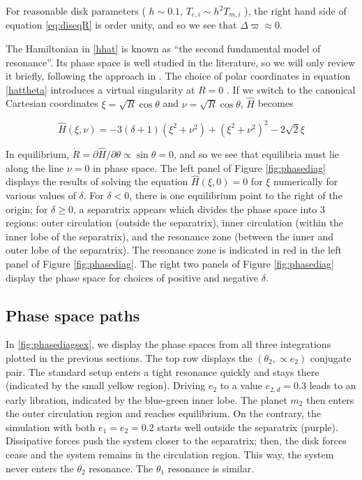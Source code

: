\documentclass{mnras}
\renewcommand{\d}{\partial}
\begin{document}
For reasonable disk parameters ( \(h\sim 0.1\), \(T_{e,i}\sim h^2
T_{m,i}\) ), the right hand side of equation \eqref{eq:diseqR}
is order unity, and so we see that \(\Delta\varpi\approx 0\).


The Hamiltonian in \eqref{hhat} is known as ``the second fundamental
model of resonance''. Its phase space is well studied in the
literature, so we will only review it briefly, following the approach
in \cite{henrard_second_1983}.  The choice of polar coordinates in
equation \eqref{hattheta} introduces a virtual singularity at \(R=0\)
\cite{henrard_second_1983}.  If we switch to the canonical Cartesian
coordinates \(\xi = \sqrt{R}\cos\theta\) and \(\nu = \sqrt{R}\cos\theta\),
\(\hat H\) becomes

\begin{equation}
  \hat H(\xi,\nu) = -3(\delta+1)(\xi^2+\nu^2) + (\xi^2+\nu^2)^2 -2\sqrt2
  \xi
\end{equation}

In equilibrium, \(\dot R = \d\hat H/\d\theta \propto \sin\theta= 0\),
and so we see that equilibria must lie along the line \(\nu=0\) in phase
space.  The left panel of Figure \ref{fig:phasediag} displays the
results of solving the equation \(\hat H(\xi, 0) = 0\) for \(\xi\)
numerically for various values of \(\delta\).  For \(\delta<0\), there is
one equilibrium point to the right of the origin; for \(\delta \geq 0\),
a separatrix appears which divides the phase space into 3 regions:
outer circulation (outside the separatrix), inner circulation (within
the inner lobe of the separatrix), and the resonance zone (between the
inner and outer lobe of the separatrix).  The resonance zone is
indicated in red in the left panel of Figure \ref{fig:phasediag}.  The
right two panels of Figure \ref{fig:phasediag} display the phase space
for choices of positive and negative \(\delta\).

\subsection{Phase space paths}
\label{sec:orga7d9d09}
\begin{figure*}
  \centering
  \texttt{[image: \{./relative-geometry]}.png}
  \caption{ }
  \label{fig:relgeom}
\end{figure*}
In \ref{fig:phasediagsex}, we display the phase spaces from all three
integrations plotted in the previous sections.
The top row displays the \((\theta_2, \propto e_2)\) conjugate pair.
The standard setup enters a tight resonance quickly and stays there (indicated by the small yellow region).
Driving \(e_2\) to a value \(e_{2,d}=0.3\) leads to an early libration, indicated by the blue-green inner lobe.
The planet \(m_2\) then enters the outer circulation region and reaches equilibrium.
On the contrary, the simulation with both \(e_1 = e_2 = 0.2\) starts well outside the separatrix (purple).
Dissipative forces push the system closer to the separatrix; then, the disk forces cease
and the system remains in the circulation region. This way, the system never enters the \(\theta_2\)
resonance. The \(\theta_1\) resonance is similar.
\end{document}
